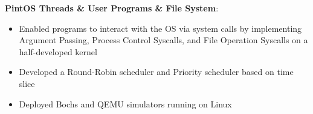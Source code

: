 \documentclass[letterpaper,11pt]{article}
\newcommand{\resumeItem}[2]{
  \item\small{
    \textbf{#1}{: #2 \vspace{-2pt}}
  }
}
\newcommand{\resumeSubItem}[2]{\resumeItem{#1}{#2}\vspace{-4pt}}
\begin{document}
   \resumeSubItem
       {PintOS Threads \& User Programs \& File System}{}
       \begin{itemize}
       
       \item Enabled programs to interact with the OS via system calls by implementing Argument Passing, Process Control Syscalls, and File Operation Syscalls on a half-developed kernel
       \item Developed a Round-Robin scheduler and Priority scheduler based on time slice
       \item Deployed Bochs and QEMU simulators running on Linux
       \end{itemize}
  
  
        
      
\end{document}
